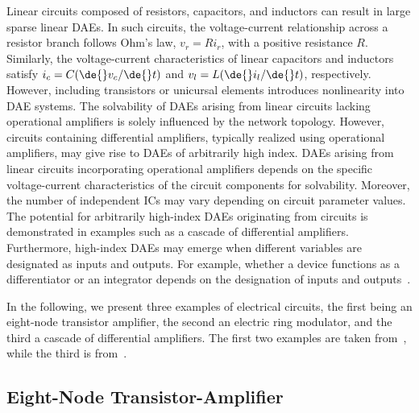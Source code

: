 Linear circuits composed of resistors, capacitors, and inductors can result in large sparse linear \acp{DAE}. In such circuits, the voltage-current relationship across a resistor branch follows Ohm's law, $v_r = Ri_r$, with a positive resistance $R$. Similarly, the voltage-current characteristics of linear capacitors and inductors satisfy $i_c = C(\de{}v_c/\de{}t)$ and $v_l = L(\de{}i_l/\de{}t)$, respectively. However, including transistors or unicursal elements introduces nonlinearity into \ac{DAE} systems. The solvability of \acp{DAE} arising from linear circuits lacking operational amplifiers is solely influenced by the network topology. However, circuits containing differential amplifiers, typically realized using operational amplifiers, may give rise to \acp{DAE} of arbitrarily high index. \acp{DAE} arising from linear circuits incorporating operational amplifiers depends on the specific voltage-current characteristics of the circuit components for solvability. Moreover, the number of independent \acp{IC} may vary depending on circuit parameter values. The potential for arbitrarily high-index \acp{DAE} originating from circuits is demonstrated in examples such as a cascade of differential amplifiers. Furthermore, high-index \acp{DAE} may emerge when different variables are designated as inputs and outputs. For example, whether a device functions as a differentiator or an integrator depends on the designation of inputs and outputs~\cite{brenan1995numerical}.

In the following, we present three examples of electrical circuits, the first being an eight-node transistor amplifier, the second an electric ring modulator, and the third a cascade of differential amplifiers. The first two examples are taken from~\cite{lioen1998test, mazzia2008test}, while the third is from~\cite{brenan1995numerical}.

\subsection{Eight-Node Transistor-Amplifier}

